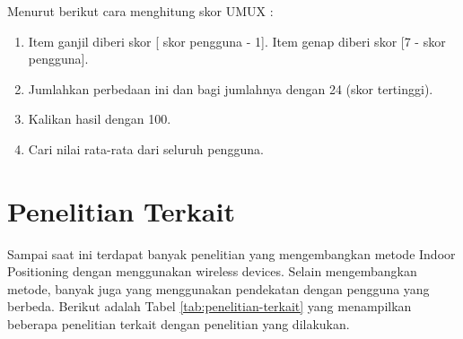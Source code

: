 \par Menurut \citep{finstad2010usability} berikut cara menghitung skor UMUX :

\begin{enumerate}
\item Item ganjil diberi skor [ skor pengguna - 1]. Item genap diberi skor [7 - skor pengguna].

\item Jumlahkan perbedaan ini dan bagi jumlahnya dengan 24 (skor tertinggi).

\item Kalikan hasil dengan 100.

\item Cari nilai rata-rata dari seluruh pengguna.
\end{enumerate}

\newpage
\section{Penelitian Terkait}
Sampai saat ini terdapat banyak penelitian yang mengembangkan metode Indoor Positioning dengan menggunakan wireless devices. Selain mengembangkan metode, banyak juga yang menggunakan pendekatan dengan pengguna yang berbeda. Berikut adalah Tabel  \ref{tab:penelitian-terkait} yang menampilkan beberapa penelitian terkait dengan penelitian yang dilakukan.

